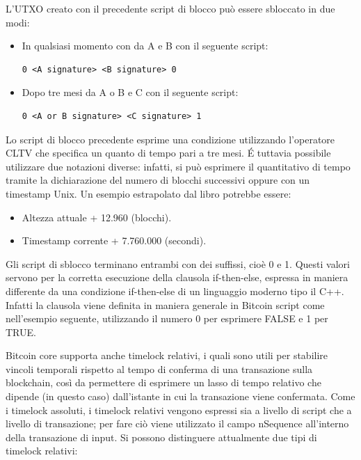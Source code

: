 

L’UTXO creato con il precedente script di blocco può essere sbloccato in due modi:
\begin{itemize}
  \item In qualsiasi momento con da A e B con il seguente script:
  \begin{lstlisting}[language=bitcoinscript]
   0 <A signature> <B signature> 0
  \end{lstlisting}
  \item Dopo tre mesi da A o B e C con il seguente script:
  \begin{lstlisting}[language=bitcoinscript]
   0 <A or B signature> <C signature> 1
  \end{lstlisting}
\end{itemize}

Lo script di blocco precedente esprime una condizione utilizzando l’operatore CLTV che specifica un quanto di tempo pari a tre mesi. \'E tuttavia possibile utilizzare due notazioni diverse: infatti, si può esprimere il quantitativo di tempo tramite la dichiarazione del numero di blocchi successivi oppure con un timestamp Unix. Un esempio estrapolato dal libro \cite{bitcoinbook} potrebbe essere:
\begin{itemize}
  \item Altezza attuale + 12.960 (blocchi).
  \item Timestamp corrente + 7.760.000 (secondi).
\end{itemize}

Gli script di sblocco terminano entrambi con dei suffissi, cioè 0 e 1. Questi valori servono per la corretta esecuzione della clausola if-then-else, espressa in maniera differente da una condizione if-then-else di un linguaggio moderno tipo il C++. Infatti la clausola viene definita in maniera generale in Bitcoin script come nell’esempio seguente, utilizzando il numero 0 per esprimere FALSE e 1 per TRUE.



Bitcoin core supporta anche timelock relativi, i quali sono utili per stabilire vincoli temporali rispetto al tempo di conferma di una transazione sulla blockchain, così da permettere di esprimere un lasso di tempo relativo che dipende (in questo caso) dall’istante in cui la transazione viene confermata.
Come i timelock assoluti, i timelock relativi vengono espressi sia a livello di script che a livello di transazione; per fare ciò viene utilizzato il campo nSequence all’interno della transazione di input.
Si possono distinguere attualmente due tipi di timelock relativi:

